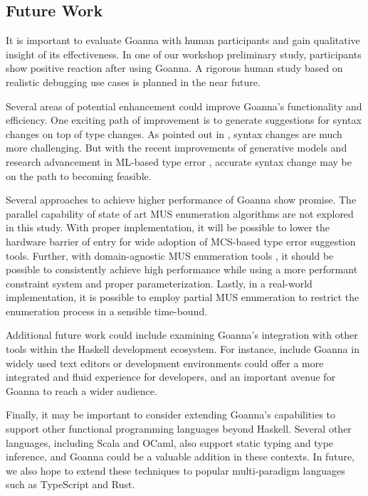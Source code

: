 \subsection{Future Work}\label{sec:future-work}
  	It is important to evaluate Goanna with human participants  and gain qualitative insight of its effectiveness. In  one of our workshop preliminary study, participants show positive reaction after using Goanna. A rigorous human study based on realistic debugging use cases is planned in the near future.   
  	
  	
    Several areas of potential enhancement could improve Goanna's functionality and efficiency. One exciting path of improvement is to generate suggestions for syntax changes on top of type changes. As pointed out in \cite{Chen2014-dz}, syntax changes are much more challenging. But with the recent improvements of generative models and research advancement in ML-based type error \cite{Seidel2017-uf}, accurate syntax change may be on the path to becoming feasible.

    Several approaches to achieve higher performance of Goanna show promise. The parallel capability of state of art MUS enumeration \cite{Zhao2016-bu} algorithms are not explored in this study. With proper implementation, it will be possible to lower the hardware barrier of entry for wide adoption of MCS-based type error suggestion tools. Further, with domain-agnostic MUS enumeration tools \cite{Bendik2020-pz}, it should be possible to consistently achieve high performance while using a more performant constraint system and proper parameterization. Lastly, in a real-world implementation, it is possible to employ partial MUS enumeration \cite{Previti2013-mr,Liffiton2016-xi} to restrict the enumeration process in a sensible time-bound.

    Additional future work could include examining Goanna's integration with other tools within the Haskell development ecosystem. For instance, include Goanna in widely used text editors or development environments could offer a more integrated and fluid experience for developers, and an important avenue for Goanna to reach a wider audience. 

    Finally, it may be important to consider extending Goanna's capabilities to support other functional programming languages beyond Haskell. Several other languages, including Scala and OCaml, also support static typing and type inference, and Goanna could be a valuable addition in these contexts. In future, we also hope to extend these techniques to popular multi-paradigm languages such as TypeScript and Rust.


